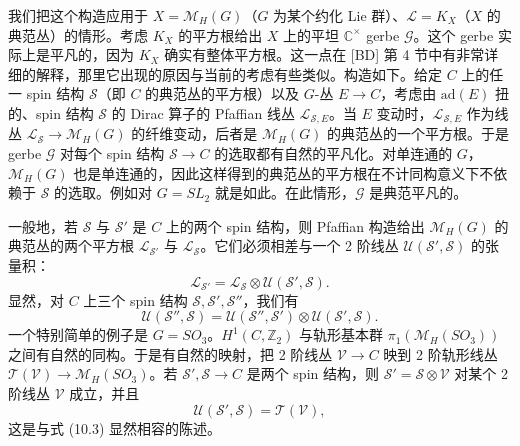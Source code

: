 我们把这个构造应用于 $X=\mathcal{M}_H(G)$（$G$ 为某个约化 Lie 群）、$\mathcal{L}=K_X$（$X$ 的典范丛）的情形。考虑 $K_X$ 的平方根给出 $X$ 上的平坦 $\mathbb{C}^\times$ gerbe $\mathcal{G}$。这个 gerbe 实际上是平凡的，因为 $K_X$ 确实有整体平方根。这一点在 [BD] 第 4 节中有非常详细的解释，那里它出现的原因与当前的考虑有些类似。构造如下。给定 $C$ 上的任一 spin 结构 $\mathcal{S}$（即 $C$ 的典范丛的平方根）以及 $G$-丛 $E\to C$，考虑由 $\mathrm{ad}(E)$ 扭的、spin 结构 $\mathcal{S}$ 的 Dirac 算子的 Pfaﬃan 线丛 $\mathcal{L}_{\mathcal{S},E}$。当 $E$ 变动时，$\mathcal{L}_{\mathcal{S},E}$ 作为线丛 $\mathcal{L}_{\mathcal{S}}\to\mathcal{M}_H(G)$ 的纤维变动，后者是 $\mathcal{M}_H(G)$ 的典范丛的一个平方根。于是 gerbe $\mathcal{G}$ 对每个 spin 结构 $\mathcal{S}\to C$ 的选取都有自然的平凡化。对单连通的 $G$，$\mathcal{M}_H(G)$ 也是单连通的，因此这样得到的典范丛的平方根在不计同构意义下不依赖于 $\mathcal{S}$ 的选取。例如对 $G=SL_2$ 就是如此。在此情形，$\mathcal{G}$ 是典范平凡的。

一般地，若 $\mathcal{S}$ 与 $\mathcal{S}'$ 是 $C$ 上的两个 spin 结构，则 Pfaﬃan 构造给出 $\mathcal{M}_H(G)$ 的典范丛的两个平方根 $\mathcal{L}_{\mathcal{S}'}$ 与 $\mathcal{L}_{\mathcal{S}}$。它们必须相差与一个 2 阶线丛 $\mathcal{U}(\mathcal{S}',\mathcal{S})$ 的张量积：
\begin{equation}\tag{10.2}
\mathcal{L}_{\mathcal{S}'} = \mathcal{L}_{\mathcal{S}}\otimes\mathcal{U}(\mathcal{S}',\mathcal{S}).
\end{equation}
显然，对 $C$ 上三个 spin 结构 $\mathcal{S},\mathcal{S}',\mathcal{S}''$，我们有
\begin{equation}\tag{10.3}
\mathcal{U}(\mathcal{S}'',\mathcal{S}) = \mathcal{U}(\mathcal{S}'',\mathcal{S}')\otimes\mathcal{U}(\mathcal{S}',\mathcal{S}).
\end{equation}
一个特别简单的例子是 $G=SO_3$。$H^1(C,\mathbb{Z}_2)$ 与轨形基本群 $\pi_1(\mathcal{M}_H(SO_3))$ 之间有自然的同构。于是有自然的映射，把 2 阶线丛 $\mathcal{V}\to C$ 映到 2 阶轨形线丛 $\mathcal{T}(\mathcal{V})\to\mathcal{M}_H(SO_3)$。若 $\mathcal{S}',\mathcal{S}\to C$ 是两个 spin 结构，则 $\mathcal{S}'=\mathcal{S}\otimes\mathcal{V}$ 对某个 2 阶线丛 $\mathcal{V}$ 成立，并且
\begin{equation}\tag{10.4}
\mathcal{U}(\mathcal{S}',\mathcal{S}) = \mathcal{T}(\mathcal{V}),
\end{equation}
这是与式 (10.3) 显然相容的陈述。

